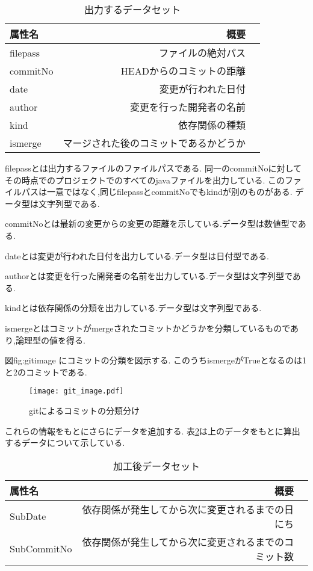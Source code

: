\documentclass[submit,ses,noauthor]{ipsj} %
\begin{document}
\begin{table}[htb]
\caption{出力するデータセット}
\begin{tabular}{|l|r|r|} \hline
属性名 & 概要 \\ \hline
filepass & ファイルの絶対パス \\ \hline
commitNo & HEADからのコミットの距離 \\ \hline
date & 変更が行われた日付 \\ \hline
author & 変更を行った開発者の名前 \\ \hline
kind & 依存関係の種類 \\ \hline
ismerge & マージされた後のコミットであるかどうか \\ \hline
\end{tabular}
\label{tab:初期データセット}
\end{table}

filepassとは出力するファイルのファイルパスである.
同一のcommitNoに対してその時点でのプロジェクトでのすべてのjavaファイルを出力している.
このファイルパスは一意ではなく,同じfilepassとcommitNoでもkindが別のものがある.
データ型は文字列型である.

commitNoとは最新の変更からの変更の距離を示している.データ型は数値型である.

dateとは変更が行われた日付を出力している.データ型は日付型である.

authorとは変更を行った開発者の名前を出力している.データ型は文字列型である.

kindとは依存関係の分類を出力している.データ型は文字列型である.

ismergeとはコミットがmergeされたコミットかどうかを分類しているものであり,論理型の値を得る.

図{fig:gitimage} にコミットの分類を図示する.
このうちismergeがTrueとなるのは1と2のコミットである.

\begin{figure*}[t]
\centering
\texttt{[image: git\_image.pdf]}
\caption{gitによるコミットの分類分け}
\label{fig:gitimage} 
\end{figure*}


これらの情報をもとにさらにデータを追加する.
表\ref{tab:加工後データセット}は上のデータをもとに算出するデータについて示している.

\begin{table}[htb]
\caption{加工後データセット}
\begin{tabular}{|l|r|r|} \hline
属性名 & 概要 \\ \hline
SubDate & 依存関係が発生してから次に変更されるまでの日にち \\ \hline
SubCommitNo & 依存関係が発生してから次に変更されるまでのコミット数 \\ \hline
\end{tabular}
\label{tab:加工後データセット}
\end{table}
\end{document}
